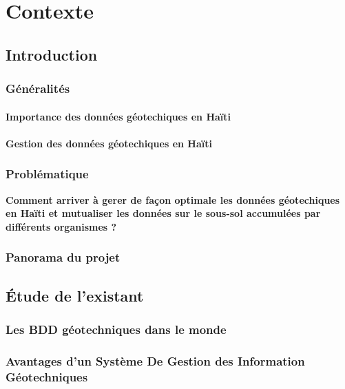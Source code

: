 \chapter{Contexte}
\section{Introduction}
    \subsection{Généralités}
        \subsubsection{Importance des données géotechiques en Haïti}
          
        \subsubsection{Gestion des données géotechiques en Haïti}
            

    \subsection{Problématique}
    \textbf{Comment arriver à gerer de façon optimale les données géo\-techiques 
    en Haïti et mutualiser les données sur le sous-sol accumulées par différents 
    organismes ?}
    \subsection{Panorama du projet}
        

\section{Étude de l'existant}
    \subsection{Les BDD géotechniques dans le monde}
        
    \subsection{Avantages d'un Système De Gestion des Information Géotechniques}
        


